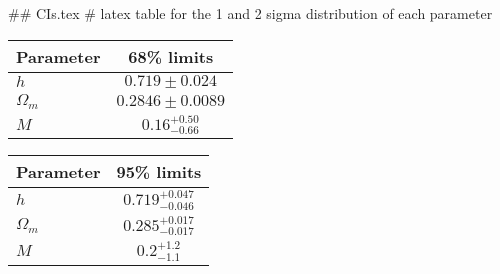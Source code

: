 ## CIs.tex
# latex table for the 1 and 2 sigma distribution of each parameter

\begin{tabular} { l  c}
 Parameter &  68\% limits\\
\hline
{\boldmath$h              $} & $0.719\pm 0.024            $\\
{\boldmath$\Omega_m       $} & $0.2846\pm 0.0089          $\\
{\boldmath$M              $} & $0.16^{+0.50}_{-0.66}      $\\
\hline
\end{tabular}

\begin{tabular} { l  c}
 Parameter &  95\% limits\\
\hline
{\boldmath$h              $} & $0.719^{+0.047}_{-0.046}   $\\
{\boldmath$\Omega_m       $} & $0.285^{+0.017}_{-0.017}   $\\
{\boldmath$M              $} & $0.2^{+1.2}_{-1.1}         $\\
\hline
\end{tabular}
